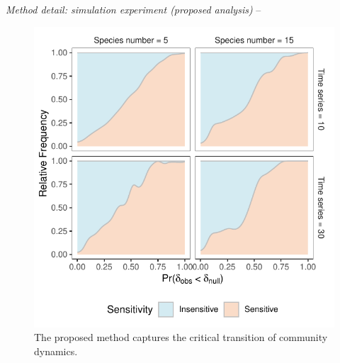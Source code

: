 \documentclass[12pt, class=article, crop=false]{standalone}
\begin{document}
\textit{Method detail: simulation experiment (proposed analysis)} --

\begin{figure}
    \includegraphics[scale=0.85]{output/figure_eigen.pdf}
    \caption{The proposed method captures the critical transition of community dynamics.}
    \label{fig:diffuse}
\end{figure}



\end{document}
